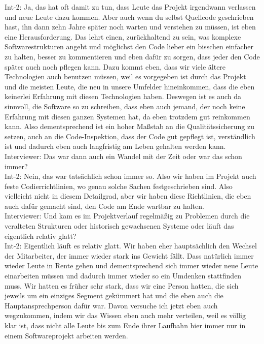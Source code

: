 Int-2: Ja, das hat oft damit zu tun, dass Leute das Projekt irgendwann verlassen und neue Leute dazu kommen. Aber auch wenn du selbst Quellcode geschrieben hast, ihn dann zehn Jahre später noch warten und verstehen zu müssen, ist eben eine Herausforderung. Das lehrt einen, zurückhaltend zu sein, was komplexe Softwarestrukturen angeht und möglichst den Code lieber ein bisschen einfacher zu halten, besser zu kommentieren und eben dafür zu sorgen, dass jeder den Code später auch noch pflegen kann. Dazu kommt eben, dass wir viele ältere Technologien auch benutzen müssen, weil es vorgegeben ist durch das Projekt und die meisten Leute, die neu in unsere Umfelder hineinkommen, dass die eben keinerlei Erfahrung mit diesen Technologien haben. Deswegen ist es auch da sinnvoll, die Software so zu schreiben, dass eben auch jemand, der noch keine Erfahrung mit diesen ganzen Systemen hat, da eben trotzdem gut reinkommen kann. Also dementsprechend ist ein hoher Maßstab an die Qualitätssicherung zu setzen, auch an die Code-Inspektion, dass der Code gut gepflegt ist, verständlich ist und dadurch eben auch langfristig am Leben gehalten werden kann.\\
Interviewer: Das war dann auch ein Wandel mit der Zeit oder war das schon immer? \\
Int-2: Nein, das war tatsächlich schon immer so. Also wir haben im Projekt auch feste Codierrichtlinien, wo genau solche Sachen festgeschrieben sind. Also vielleicht nicht in diesem Detailgrad, aber wir haben diese Richtlinien, die eben auch dafür gemacht sind, den Code am Ende wartbar zu halten.\\
Interviewer: Und kam es im Projektverlauf regelmäßig zu Problemen durch die veralteten Strukturen oder historisch gewachsenen Systeme oder läuft das eigentlich relativ glatt?\\
Int-2: Eigentlich läuft es relativ glatt. Wir haben eher hauptsächlich den Wechsel der Mitarbeiter, der immer wieder stark ins Gewicht fällt. Dass natürlich immer wieder Leute in Rente gehen und dementsprechend sich immer wieder neue Leute einarbeiten müssen und dadurch immer wieder so ein Umdenken stattfinden muss. Wir hatten es früher sehr stark, dass wir eine Person hatten, die sich jeweils um ein einziges Segment gekümmert hat und die eben auch die Hauptansprechperson dafür war. Davon versuche ich jetzt eben auch wegzukommen, indem wir das Wissen eben auch mehr verteilen, weil es völlig klar ist, dass nicht alle Leute bis zum Ende ihrer Laufbahn hier immer nur in einem Softwareprojekt arbeiten werden. \\
